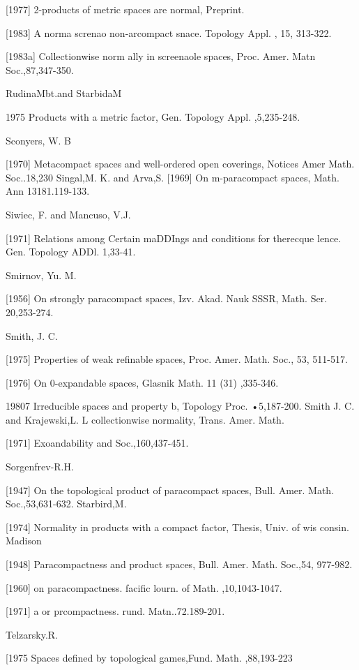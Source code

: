 \documentclass[main.tex]{subfiles}
\begin{document}
[1977]
	2-products of metric spaces are normal, Preprint.

[1983]
A norma screnao non-arcompact
snace. Topology
Appl. , 15,
313-322.

[1983a]
Collectionwise
norm
ally in screenaole spaces, Proc. Amer. Matn
Soc.,87,347-350.

\noindent RudinaMbt.and StarbidaM

1975 Products with a metric factor, Gen. Topology Appl. ,5,235-248.

\noindent Sconyers, W. B

[1970]
Metacompact spaces and well-ordered open coverings, Notices Amer
Math. Soc..18,230
Singal,M. K. and Arva,S.
[1969]
On m-paracompact spaces, Math. Ann
13181.119-133.

Siwiec, F. and Mancuso, V.J.

[1971]
Relations among
Certain maDDIngs and
conditions for therecque
lence. Gen. Topology ADDl. 1,33-41.

\noindent Smirnov, Yu. M.

[1956]
On strongly paracompact spaces, Izv. Akad. Nauk SSSR, Math. Ser.
20,253-274.

\noindent Smith, J. C.

[1975] Properties of weak refinable spaces, Proc. Amer. Math. Soc., 53,
511-517.

[1976] On 0-expandable spaces, Glasnik Math. 11 (31) ,335-346.

19807 Irreducible spaces and property b, Topology Proc.
•5,187-200.
Smith J. C. and Krajewski,L. L
collectionwise normality, Trans. Amer. Math.

[1971]
Exoandability and
Soc.,160,437-451.

\noindent Sorgenfrev-R.H.

[1947]
On the topological product of paracompact spaces, Bull. Amer. Math.
Soc.,53,631-632.
Starbird,M.

[1974]
Normality in products with a compact factor, Thesis, Univ. of wis
consin. Madison

[1948]
Paracompactness and product spaces, Bull. Amer. Math. Soc.,54,
977-982.

[1960]
on paracompactness. facific lourn.
of Math. ,10,1043-1047.

[1971]
a or prcompactness. rund. Matn..72.189-201.

\noindent Telzarsky.R.

[1975 Spaces defined by topological games,Fund. Math. ,88,193-223
\end{document}
